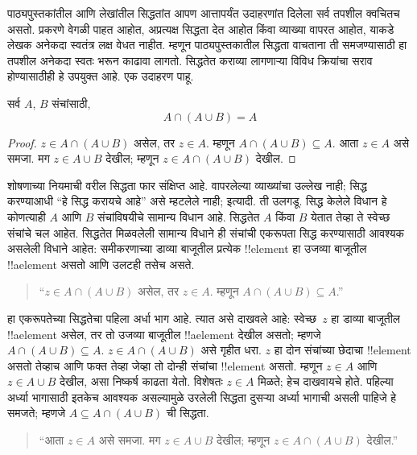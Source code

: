 \documentclass[../../../include/open-logic-section]{subfiles}
\begin{document}

पाठ्यपुस्तकांतील आणि लेखांतील सिद्धतांत आपण आत्तापर्यंत उदाहरणांत दिलेला सर्व तपशील क्वचितच असतो. प्रकरणे वेगळी पाहत आहोत, अप्रत्यक्ष सिद्धता देत आहोत किंवा व्याख्या वापरत आहोत, याकडे लेखक अनेकदा स्वतंत्र लक्ष वेधत नाहीत. म्हणून पाठ्यपुस्तकातील सिद्धता वाचताना ती समजण्यासाठी हा तपशील अनेकदा स्वतः भरून काढावा लागतो. सिद्धतेत कराव्या लागणाऱ्या विविध क्रियांचा सराव होण्यासाठीही हे उपयुक्त आहे. एक उदाहरण पाहू.

\begin{prop}[शोषणाचा नियम]
सर्व $A$, $B$ संचांसाठी,
\[
A \cap (A \cup B) = A
\]
\end{prop}

\begin{proof}
$z \in A \cap (A \cup B)$ असेल, तर $z \in A$. म्हणून $A \cap (A \cup B) \subseteq A$. आता $z \in A$ असे समजा. मग $z \in A \cup B$ देखील; म्हणून $z \in A \cap (A \cup B)$ देखील.
\end{proof}

शोषणाच्या नियमाची वरील सिद्धता फार संक्षिप्त आहे. वापरलेल्या व्याख्यांचा उल्लेख नाही; सिद्ध करण्याआधी “हे सिद्ध करायचे आहे” असे म्हटलेले नाही; इत्यादी. ती उलगडू. सिद्ध केलेले विधान हे कोणत्याही $A$ आणि $B$ संचांविषयीचे सामान्य विधान आहे. सिद्धतेत $A$ किंवा $B$ येतात तेव्हा ते स्वेच्छ संचांचे चल आहेत. सिद्धतेत मिळवलेली सामान्य विधाने ही संचांची एकरूपता सिद्ध करण्यासाठी आवश्यक असलेली विधाने आहेत: समीकरणाच्या डाव्या बाजूतील प्रत्येक !!{element} हा उजव्या बाजूतील !!a{element} असतो आणि उलटही तसेच असते.

\begin{quote}
“$z \in A \cap (A \cup B)$ असेल, तर $z \in A$. म्हणून $A \cap (A \cup B) \subseteq A$.”
\end{quote}

हा एकरूपतेच्या सिद्धतेचा पहिला अर्धा भाग आहे. त्यात असे दाखवले आहे: स्वेच्छ~$z$ हा डाव्या बाजूतील !!a{element} असेल, तर तो उजव्या बाजूतील !!a{element} देखील असतो; म्हणजे $A \cap (A \cup B) \subseteq A$. $z \in A \cap (A \cup B)$ असे गृहीत धरा. $z$ हा दोन संचांच्या छेदाचा !!{element} असतो तेव्हाच आणि फक्त तेव्हा जेव्हा तो दोन्ही संचांचा !!{element} असतो. म्हणून $z \in A$ आणि $z \in A \cup B$ देखील, असा निष्कर्ष काढता येतो. विशेषतः $z \in A$ मिळते; हेच दाखवायचे होते. पहिल्या अर्ध्या भागासाठी इतकेच आवश्यक असल्यामुळे उरलेली सिद्धता दुसऱ्या अर्ध्या भागाची असली पाहिजे हे समजते; म्हणजे $A \subseteq A \cap (A \cup B)$ ची सिद्धता.

\begin{quote}
“आता $z \in A$ असे समजा. मग $z \in A \cup B$ देखील; म्हणून $z \in A \cap (A \cup B)$ देखील.”
\end{quote}
\end{document}
